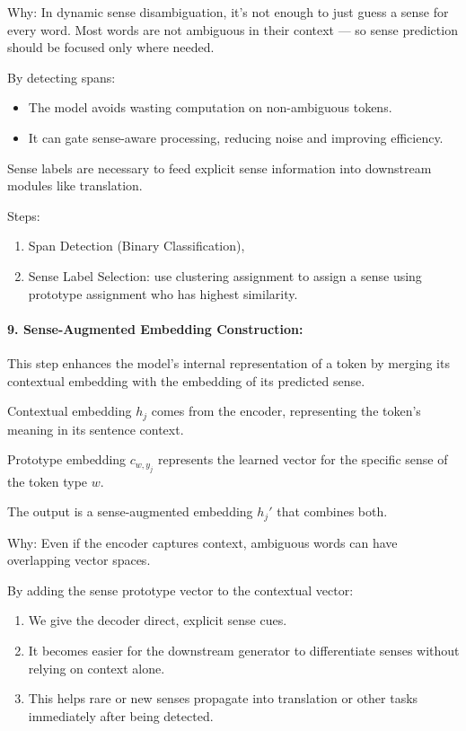 \documentclass[a4paper,12pt]{article}
\begin{document}
Why: In dynamic sense disambiguation, it’s not enough to just guess a sense for every word. Most words are not ambiguous in their context --- so sense prediction should be focused only where needed.

By detecting spans:
\begin{itemize}
    \item The model avoids wasting computation on non-ambiguous tokens.
    \item It can gate sense-aware processing, reducing noise and improving efficiency.
\end{itemize}

Sense labels are necessary to feed explicit sense information into downstream modules like translation.

Steps:
\begin{enumerate}
    \item Span Detection (Binary Classification),
    \item Sense Label Selection: use clustering assignment to assign a sense using prototype assignment who has highest similarity.
\end{enumerate}

\paragraph{9. Sense-Augmented Embedding Construction:}
This step enhances the model’s internal representation of a token by merging its contextual embedding with the embedding of its predicted sense.

Contextual embedding $h_j$ comes from the encoder, representing the token’s meaning in its sentence context.

Prototype embedding $c_{w,y_j}$ represents the learned vector for the specific sense of the token type $w$.

The output is a sense-augmented embedding $h_j'$ that combines both.

Why: Even if the encoder captures context, ambiguous words can have overlapping vector spaces.

By adding the sense prototype vector to the contextual vector:
\begin{enumerate}
    \item We give the decoder direct, explicit sense cues.
    \item It becomes easier for the downstream generator to differentiate senses without relying on context alone.
    \item This helps rare or new senses propagate into translation or other tasks immediately after being detected.
\end{enumerate}
\end{document}
